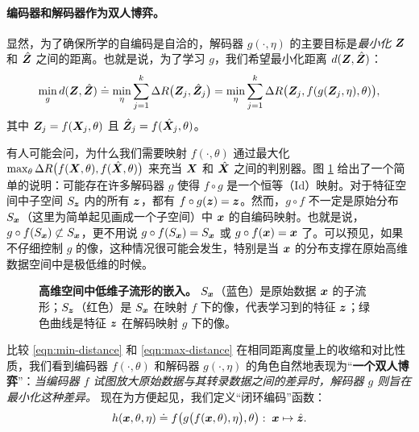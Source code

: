 \documentclass[../../book-main.tex]{subfiles}
\begin{document}
\paragraph{编码器和解码器作为双人博弈。}
显然，为了确保所学的自编码是自洽的，解码器 $g(\cdot, \eta)$ 的主要目标是{\em 最小化} $\bm{Z}$ 和 $\hat {\bm{Z}}$ 之间的距离。也就是说，为了学习 $g$，我们希望最小化距离 $d(\bm{Z}, \hat {\bm{Z}})$：
\begin{equation}
\min_g d(\bm{Z}, \hat {\bm{Z}}) \doteq \min_\eta  \sum_{j=1}^k \Delta R\big(\bm{Z}_j, \hat{\bm{Z}}_j\big) =  \min_\eta  \sum_{j=1}^k \Delta R\big(\bm{Z}_j, f(g(\bm{Z}_j, \eta),\theta)\big),
\label{eqn:min-distance}
\end{equation}
其中 $\bm{Z}_j = f(\bm{X}_j,\theta)$ 且 $\hat {\bm{Z}}_j = f(\hat{\bm{X}}_j,\theta)$。

\begin{example}
有人可能会问，为什么我们需要映射 $f(\cdot, \theta)$ 通过最大化 $\max_\theta \Delta R\big(f(\bm{X},\theta), f(\hat {\bm{X}},\theta)\big)$ 来充当 $\bm{X}$ 和 $\hat {\bm{X}}$ 之间的判别器。图 \ref{fig:decoder} 给出了一个简单的说明：可能存在许多解码器 $g$ 使得 $f\circ g$ 是一个恒等（Id）映射。对于特征空间中子空间 $S_{\bm{z}}$ 内的所有 $\bm{z}$，都有 $f\circ g(\bm{z}) = \bm{z}$。然而，$g\circ f$ 不一定是原始分布 $S_{\bm{x}}$（这里为简单起见画成一个子空间）中 $\bm{x}$ 的自编码映射。也就是说，$g\circ f(S_{\bm{x}}) \not\subset S_{\bm{x}}$，更不用说 $g\circ f(S_{\bm{x}}) = S_{\bm{x}}$ 或 $g\circ f(\bm{x}) = \bm{x}$ 了。可以预见，如果不仔细控制 $g$ 的像，这种情况很可能会发生，特别是当 $\bm{x}$ 的分布支撑在原始高维数据空间中是极低维的时候。
\end{example}
\begin{figure}
\caption{\textbf{高维空间中低维子流形的嵌入。} $S_{\bm{x}}$（蓝色）是原始数据 $\bm{x}$ 的子流形；$S_{\bm{z}}$（红色）是 $S_{\bm{x}}$ 在映射 $f$ 下的像，代表学习到的特征 $\bm{z}$；绿色曲线是特征 $\bm{z}$ 在解码映射 $g$ 下的像。} \label{fig:decoder}
\end{figure} 

比较 \eqref{eqn:min-distance} 和 \eqref{eqn:max-distance} 在相同距离度量上的收缩和对比性质，我们看到编码器 $f(\cdot, \theta)$ 和解码器 $g(\cdot, \eta)$ 的角色自然地表现为“{\bf 一个双人博弈}”：{\em 当编码器 $f$ 试图放大原始数据与其转录数据之间的差异时，解码器 $g$ 则旨在最小化这种差异。} 现在为方便起见，我们定义“闭环编码”函数：
\begin{equation}
    h(\bm{x}, \theta, \eta) \doteq f\big(g\big(f(\bm{x}, \theta), \eta\big), \theta\big): \; \bm{x} \mapsto \hat {\bm{z}}.
\end{equation}
\end{document}
